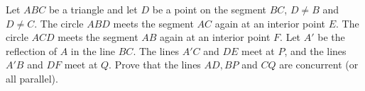 Let $ABC$ be a triangle and let $D$ be a point on the segment $BC$, $D\neq B$ and $D\neq C$. The circle $ABD$ meets the segment $AC$ again at an interior point $E$. The circle $ACD$ meets the segment $AB$ again at an interior point $F$. Let $A'$ be the reflection of $A$ in the line $BC$. The lines $A'C$ and $DE$ meet at $P$, and the lines $A'B$ and $DF$ meet at $Q$. Prove that the lines $AD, BP$ and $CQ$ are concurrent (or all parallel).